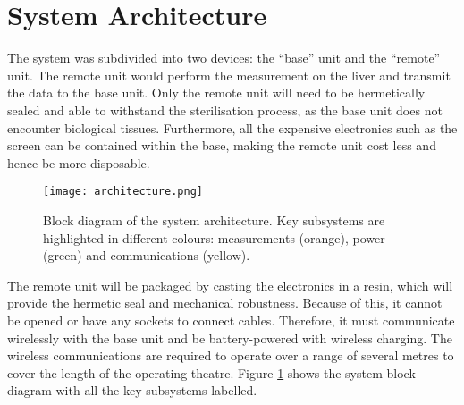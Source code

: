 \section{System Architecture}

The system was subdivided into two devices: the ``base'' unit and the ``remote'' unit. The remote unit would perform the measurement on the liver and transmit the data to the base unit. Only the remote unit will need to be hermetically sealed and able to withstand the sterilisation process, as the base unit does not encounter biological tissues. Furthermore, all the expensive electronics such as the screen can be contained within the base, making the remote unit cost less and hence be more disposable.\\

\begin{figure}[htb]
	\centering
	\texttt{[image: architecture.png]}
	\caption{Block diagram of the system architecture. Key subsystems are highlighted in different colours: measurements (orange), power (green) and communications (yellow).}
	\label{fig: architecture}
\end{figure}

The remote unit will be packaged by casting the electronics in a resin, which will provide the hermetic seal and mechanical robustness. Because of this, it cannot be opened or have any sockets to connect cables. Therefore, it must communicate wirelessly with the base unit and be battery-powered with wireless charging. The wireless communications are required to operate over a range of several metres to cover the length of the operating theatre. Figure \ref{fig: architecture} shows the system block diagram with all the key subsystems labelled.\\